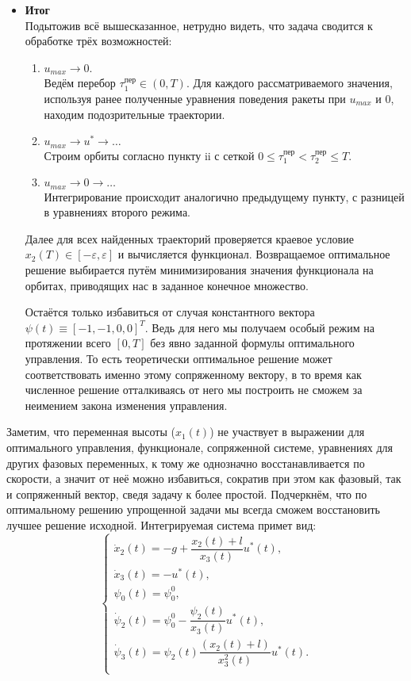 \documentclass[a4paper,12pt]{article}
\begin{document}
\begin{itemize}
\item \textbf{Итог} \\
Подытожив всё вышесказанное, нетрудно видеть, что задача сводится к обработке трёх возможностей:  
\begin{enumerate}
	\item $u_{max} \rightarrow 0$. \\
Ведём перебор $\tau_1^{\text{пер}} \in (0, T)$. Для каждого рассматриваемого значения, используя ранее полученные уравнения поведения ракеты при $u_{max}$ и $0$, находим подозрительные траектории.
	\item $u_{max} \rightarrow u^* \rightarrow \dots$ \\
Строим орбиты согласно пункту $\mathrm{ii}$ с сеткой $0 \leqslant \tau_1^{\text{пер}} < \tau_2^{\text{пер}} \leqslant T$.
	\item $u_{max} \rightarrow 0 \rightarrow \dots$ \\
Интегрирование происходит аналогично предыдущему пункту, с разницей в уравнениях второго режима.
\end{enumerate}
Далее для всех найденных траекторий проверяется краевое условие $x_2(T) \in [-\varepsilon, \varepsilon]$ и вычисляется функционал. Возвращаемое оптимальное решение выбирается путём минимизирования значения функционала на орбитах, приводящих нас в заданное конечное множество. 

Остаётся только избавиться от случая константного вектора $\psi(t) \equiv [-1, -1, 0, 0]^{T}$. Ведь для него мы получаем особый режим на протяжении всего $[0, T]$ без явно заданной формулы оптимального управления. То есть теоретически оптимальное решение может соответствовать именно этому сопряженному вектору, в то время как численное решение отталкиваясь от него мы построить не сможем за неимением закона изменения управления.
\end{itemize} 
Заметим, что переменная высоты ($x_1(t)$) не участвует в выражении для оптимального управления, функционале, сопряженной системе, уравнениях для других фазовых переменных, к тому же однозначно восстанавливается по скорости, а значит от неё можно избавиться, сократив при этом как фазовый, так и сопряженный вектор, сведя задачу к более простой. Подчеркнём, что по оптимальному решению упрощенной задачи мы всегда сможем восстановить лучшее решение исходной. Интегрируемая система примет вид: 
$$\begin{cases}
	\dot{x}_2(t) = -g + \dfrac{x_2(t) + l}{x_3(t)}u^*(t), \\
	\dot{x}_3(t) = -u^*(t), \\
	\psi_0(t) = \psi_0^0, \\ 
	\dot{\psi}_2(t) = \psi_{0}^0 - \dfrac{\psi_{2}(t)}{x_{3}(t)}u^*(t), \\
	\dot{\psi}_3(t) = \psi_2(t) \dfrac{(x_2(t) + l)}{x_3^2(t)} u^*(t). \\ 
\end{cases} $$
\end{document}
